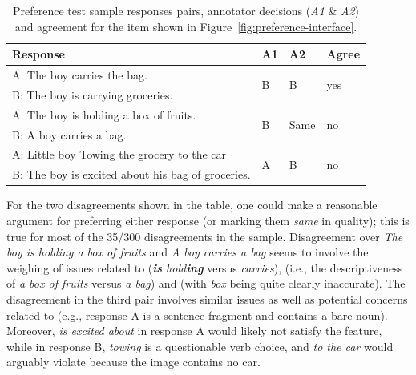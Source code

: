 \begin{table}[htb!]
\begin{center}
\begin{tabular}{|l|l|l|l|}
\hline
 Response & A1 & A2 & Agree \\
\hline
\hline
A: The boy carries the bag. & \multirow{2}{*}{B} & \multirow{2}{*}{B} & \multirow{2}{*}{yes} \\
\cline{1-1}
B: The boy is carrying groceries. & & & \\
\hline
\hline
A: The boy is holding a box of fruits. & \multirow{2}{*}{B} & \multirow{2}{*}{Same} & \multirow{2}{*}{no} \\
\cline{1-1}
B: A boy carries a bag. & & & \\
\hline
\hline
A: Little boy Towing the grocery to the car & \multirow{2}{*}{A} & \multirow{2}{*}{B} & \multirow{2}{*}{no} \\
\cline{1-1}
B: The boy is excited about his bag of groceries. & & & \\
\hline
\end{tabular}
\caption{\label{tab:preference-example-pairs} Preference test sample responses pairs, annotator decisions (\textit{A1} \& \textit{A2}) and agreement for the item shown in Figure~\ref{fig:preference-interface}.}
\end{center}
\end{table}

For the two disagreements shown in the table, one could make a reasonable argument for preferring either response (or marking them \textit{same} in quality); this is true for  most of the 35/300 disagreements in the sample. Disagreement over \textit{The boy is holding a box of fruits} and \textit{A boy carries a bag} seems to involve the weighing of issues related to  (\textit{\textbf{is} hold\textbf{ing}} versus \textit{carries}),  (i.e., the descriptiveness of \textit{a box of fruits} versus \textit{a bag}) and  (with \textit{box} being quite clearly inaccurate). The disagreement in the third pair involves similar  issues as well as potential concerns related to  (e.g., response A is a sentence fragment and contains a bare noun). Moreover, \textit{is excited about} in response A would likely not satisfy the  feature, while in response B, \textit{towing} is a questionable verb choice, and \textit{to the car} would arguably violate  because the image contains no car.

